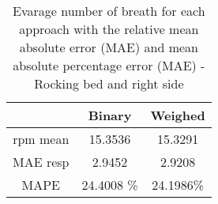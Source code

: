 
\begin{table}
    \centering 
    \begin{tabular}{|c|c|c|}
    \hline 
    & Binary & Weighed  \\ 
    
    \hline 
    rpm mean &15.3536  & 15.3291 \\
    MAE resp & 2.9452 &      2.9208 \\ 
    MAPE  & 24.4008 \%& 24.1986\% \\ 
    \hline 
\end{tabular}
\caption{Evarage number of breath for each approach with the relative mean
absolute error (MAE) and mean absolute percentage error (MAE) - Rocking bed
and right side}
\label{tab:RightRockingMetrics}
\end{table}